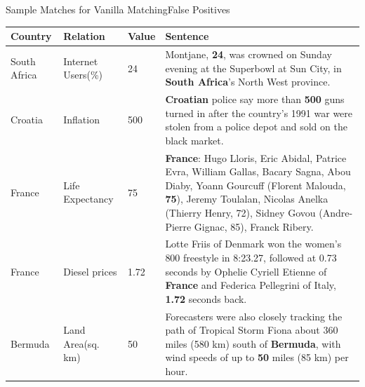 \documentclass{beamer}
\begin{document}
\begin{frame}{Sample Matches for Vanilla Matching}{False Positives}

 \begin{table}
 \tiny
 \centering
 \begin{tabularx}{\textwidth}{|l|l|l|>{\raggedright}X|}
 \hline
 \textbf{Country} & \textbf{Relation} & \textbf{Value} & \textbf{Sentence}\tabularnewline
 \hline
  South Africa & Internet Users(\%) & 24 & Montjane, \textbf{24}, was crowned on Sunday evening at the Superbowl at Sun City, in \textbf{South Africa}'s North  West province.\tabularnewline
  \hline
 Croatia & Inflation & 500 & \textbf{Croatian} police say more than \textbf{500} guns turned in after the country's 1991 war were stolen from a police depot and sold on the black market.\tabularnewline
  \hline
  France & Life Expectancy & 75 & \textbf{France}: Hugo Lloris, Eric Abidal, Patrice Evra, William Gallas, Bacary Sagna, Abou Diaby, Yoann Gourcuff (Florent Malouda, \textbf{75}), Jeremy Toulalan, Nicolas Anelka (Thierry Henry, 72), Sidney Govou (Andre-Pierre Gignac, 85), Franck Ribery.\tabularnewline
  \hline
  France & Diesel prices & 1.72 & Lotte Friis of Denmark won the women's 800 freestyle in 8:23.27, followed at 0.73 seconds by Ophelie Cyriell Etienne of \textbf{France} and Federica Pellegrini of Italy, \textbf{1.72} seconds back.\tabularnewline
  \hline
  Bermuda & Land Area(sq. km) & 50 & Forecasters were also closely tracking the path of Tropical Storm Fiona about 360 miles (580 km) south of \textbf{Bermuda}, with wind speeds of up to \textbf{50} miles (85 km) per hour.\tabularnewline
  \hline
 \end{tabularx}
 \end{table}
 \end{frame}
 
\end{document}

